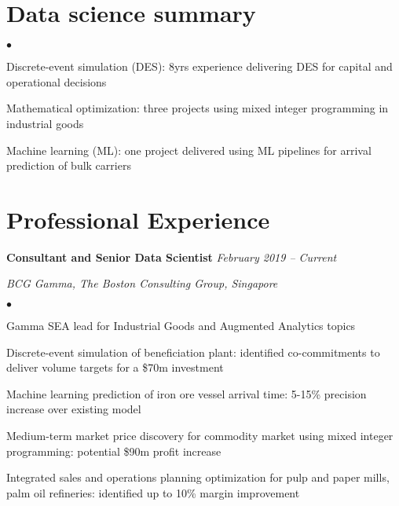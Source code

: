 \documentclass[margin,line]{resume}
\newenvironment{list1}{
  \begin{list}{}{%
      \setlength{\itemsep}{0in}
      \setlength{\parsep}{0in} \setlength{\parskip}{0in}
      \setlength{\topsep}{0in} \setlength{\partopsep}{0in}
      \setlength{\leftmargin}{0.17in}}}{\end{list}}
\newenvironment{list2}{
  \begin{list}{$\bullet$}{%
      \setlength{\itemsep}{0in}
      \setlength{\parsep}{0in} \setlength{\parskip}{0in}
      \setlength{\topsep}{0in} \setlength{\partopsep}{0in}
      \setlength{\leftmargin}{0.2in}}}{\end{list}}
\begin{document}
\begin{resume}
\section{\sc Data science summary}
\begin{list2}
\item Discrete-event simulation (DES): 8yrs experience delivering DES for capital and operational decisions
\item Mathematical optimization: three projects using mixed integer programming in industrial goods
\item Machine learning (ML): one project delivered using ML pipelines for arrival prediction of bulk carriers
\end{list2}

\section{\sc Professional Experience}
{\textbf{Consultant and Senior Data Scientist}} \hfill {\it February 2019 -- Current}\\
\vspace{-0.85\baselineskip}
\begin{list1}
\item {\it BCG Gamma, The Boston Consulting Group, Singapore}
\begin{list2}
\item Gamma SEA lead for Industrial Goods and Augmented Analytics topics
\item Discrete-event simulation of beneficiation plant: identified co-commitments to deliver volume targets for a \$70m investment 
\item Machine learning prediction of iron ore vessel arrival time: 5-15\% precision increase over existing model
\item Medium-term market price discovery for commodity market using mixed integer programming: potential \$90m profit increase
\item Integrated sales and operations planning optimization for pulp and paper mills, palm oil refineries: identified up to 10\% margin improvement 
\end{list2}
\end{list1}



\end{resume}
\end{document}
